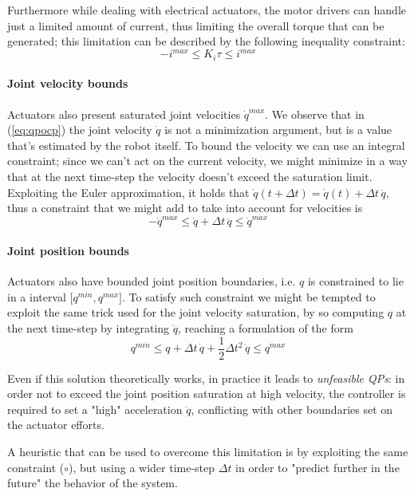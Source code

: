 	Furthermore while dealing with electrical actuators, the motor drivers can handle just a limited amount of current, thus limiting the overall torque that can be generated; this limitation can be described by the following inequality constraint:
	\[ -i^{max} \leq K_i \tau \leq i^{max} \]
	
	\paragraph{Joint velocity bounds} Actuators also present saturated joint velocities $\dot q^{max}$. We observe that in (\ref{eq:qpocp}) the joint velocity $\dot q$ is not a minimization argument, but is a value that's estimated by the robot itself. To bound the velocity we can use an integral constraint; since we can't act on the current velocity, we might minimize in a way that at the next time-step the velocity doesn't exceed the saturation limit. Exploiting the Euler approximation, it holds that $\dot q(t + \Delta t) = \dot q(t) + \Delta t \, \ddot q$, thus a constraint that we might add to take into account for velocities is
	\[ -\dot q^{max} \leq \dot q + \Delta t \, \ddot q \leq \dot q^{max} \]
	
	\paragraph{Joint position bounds} Actuators also have bounded joint position boundaries, i.e. $q $ is constrained to lie in a interval $\big[q^{min}, q^{max}\big]$. To satisfy such constraint we might be tempted to exploit the same trick used for the joint velocity saturation, by so computing $q$ at the next time-step by integrating $\ddot q$, reaching a formulation of the form
	\[ q^{min} \leq q + \Delta t\, \dot q + \frac 1 2 \Delta t^2 \, \ddot q \leq q^{max} \tag{$\circ$}\]
	
	Even if this solution theoretically works, in practice it leads to \textit{unfeasible QPs}: in order not to exceed the joint position saturation at high velocity, the controller is required to set a "high" acceleration $\ddot q$, conflicting with other boundaries set on the actuator efforts.
	
	A heuristic that can be used to overcome this limitation is by exploiting the same constraint ($\circ$), but using a wider time-step $\Delta t$ in order to "predict further in the future" the behavior of the system.
	
